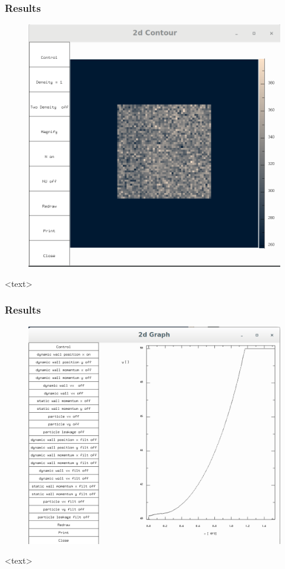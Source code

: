 \documentclass{beamer}
\begin{document}
\begin{frame}
\frametitle{Results}
\begin{figure}
\includegraphics[scale=0.2]{A1p3}
\caption{}
\end{figure}
<text>
\end{frame}

\begin{frame}
\frametitle{Results}
\begin{figure}
\includegraphics[scale=0.2]{A1p4}
\caption{}
\end{figure}
<text>
\end{frame}
\end{document}
